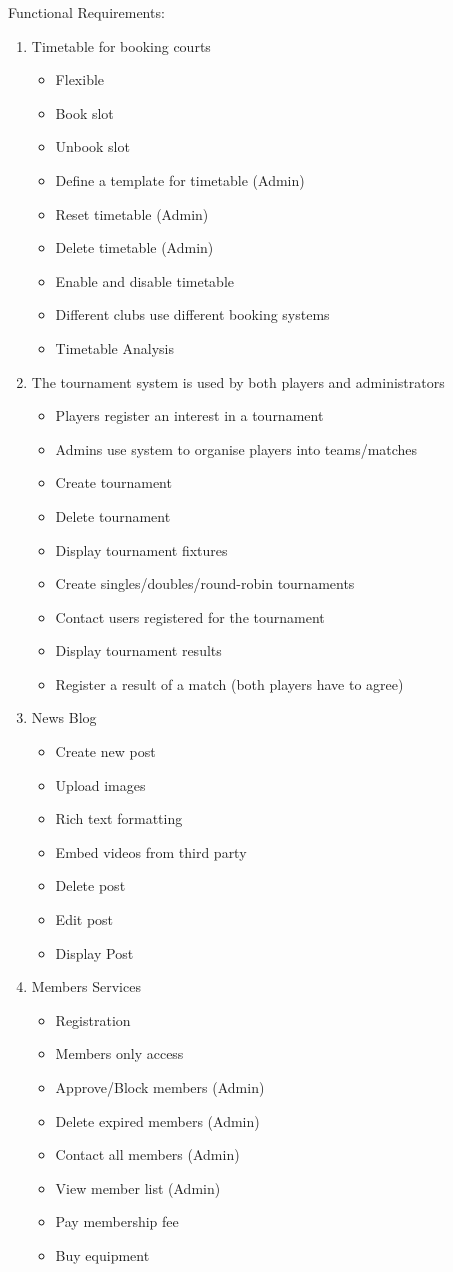 Functional Requirements:
\begin{enumerate}
\item Timetable for booking courts
\begin{itemize}
\item Flexible
\item Book slot
\item Unbook slot
\item Define a template for timetable (Admin)
\item Reset timetable (Admin)
\item Delete timetable (Admin)
\item Enable and disable timetable
\item Different clubs use different booking systems
\item Timetable Analysis
\end{itemize}

\item The tournament system is used by both players and administrators
\begin{itemize}
\item Players register an interest in a tournament
\item Admins use system to organise players into teams/matches
\item Create tournament
\item Delete tournament
\item Display tournament fixtures
\item Create singles/doubles/round-robin tournaments
\item Contact users registered for the tournament
\item Display tournament results
\item Register a result of a match (both players have to agree)
\end{itemize}
\item News Blog
\begin{itemize}
\item Create new post
\item Upload images
\item Rich text formatting
\item Embed videos from third party
\item Delete post
\item Edit post
\item Display Post
\end{itemize}
\item Members Services
\begin{itemize}
\item Registration
\item Members only access
\item Approve/Block members (Admin)
\item Delete expired members (Admin)
\item Contact all members (Admin)
\item View member list (Admin)
\item Pay membership fee
\item Buy equipment
\end{itemize}
\end{enumerate}

